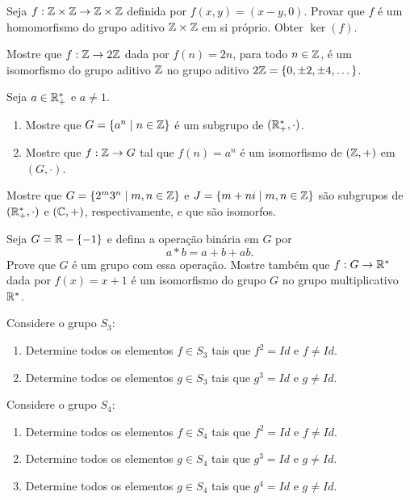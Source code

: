 \documentclass[12pt]{exam}
\begin{document}
    \questao{} Seja $f: \mathbb{Z} \times \mathbb{Z} \to \mathbb{Z} \times \mathbb{Z}$ definida por $f(x, y) = (x - y, 0)$. Provar que $f$ é um homomorfismo do grupo aditivo $\mathbb{Z} \times \mathbb{Z}$ em si pr\'oprio. Obter $\ker(f)$.

    \vspace{.3cm}

    \questao{} Mostre que $f : \mathbb{Z} \to 2\mathbb{Z}$ dada por $f(n) = 2n$, para todo $n \in \mathbb{Z}$, é um isomorfismo do grupo aditivo $\mathbb{Z}$ no grupo aditivo $2\mathbb{Z} = \{0, \pm 2, \pm 4, \dots\}$.

    \vspace{.3cm}

    \questao{} Seja $a \in \mathbb{R}_+^*$ e $a \ne 1$.
    \begin{enumerate}[label=({\alph*})]
        \item  Mostre que $G = \{a^n \mid n \in \mathbb{Z}\}$ é um subgrupo de $(\mathbb{R}_+^*, \cdot)$.

        \item Mostre que $f : \mathbb{Z} \to G$ tal que $f(n) = a^n$ é um isomorfismo de $(\mathbb{Z}, +)$ em $(G, \cdot)$.
    \end{enumerate}

    \vspace{.3cm}

    \questao{} Mostre que $G = \{2^m3^n \mid m, n \in \mathbb{Z}\}$ e $J = \{m + ni \mid m, n \in \mathbb{Z}\}$ são subgrupos de $(\mathbb{R}_+^*, \cdot)$ e $(\mathbb{C}, +)$, respectivamente, e que são isomorfos.

    \vspace{.3cm}

    \questao{} Seja $G = \mathbb{R} - \{-1\}$ e defina a operação binária em $G$ por
    \[
    a * b = a + b + ab.
    \]
    Prove que $G$ é um grupo com essa operação. Mostre também que $f : G \to \mathbb{R}^*$ dada por $f(x) = x + 1$ é um isomorfismo do grupo $G$ no grupo multiplicativo $\mathbb{R}^*$.


    \questao{} Considere o grupo $S_3$:
    \begin{enumerate}[label=({\alph*})]
        \item Determine todos os elementos $f \in S_3$ tais que $f^2 = Id$ e $f \ne Id$.

        \item Determine todos os elementos $g \in S_3$ tais que $g^3 = Id$ e $g \ne Id$.
    \end{enumerate}

    \vspace{.3cm}

    \questao{} Considere o grupo $S_4$:
    \begin{enumerate}[label=({\alph*})]
        \item Determine todos os elementos $f \in S_4$ tais que $f^2 = Id$ e $f \ne Id$.

        \item Determine todos os elementos $g \in S_4$ tais que $g^3 = Id$ e $g \ne Id$.

        \item Determine todos os elementos $g \in S_4$ tais que $g^4 = Id$ e $g \ne Id$.
    \end{enumerate}
\end{document}
